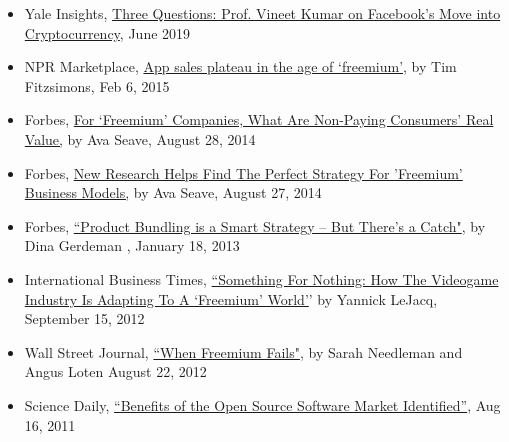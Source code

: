 \documentclass[margin, line, centered, 10pt]{res}
\begin{document}
\begin{resume}
\begin{itemize}
\item Yale Insights, \href{https://insights.som.yale.edu/insights/three-questions-prof-vineet-kumar-on-facebook-s-move-into-cryptocurrency}{Three Questions: Prof. Vineet Kumar on Facebook's Move into Cryptocurrency}, June 2019
\item NPR Marketplace, \href{http://www.marketplace.org/topics/economy/app-sales-plateau-age-freemium}{App sales plateau in the age of `freemium',} by Tim Fitzsimons, Feb 6, 2015
\item Forbes, \href{http://www.forbes.com/sites/avaseave/2014/08/28/for-freemium-companies-what-are-non-paying-consumers-real-value/}{For `Freemium' Companies, What Are Non-Paying Consumers' Real Value,} by Ava Seave, August 28, 2014
\item Forbes, \href{http://www.forbes.com/sites/avaseave/2014/08/27/choosing-the-perfect-strategy-for-freemiums/}{New Research Helps Find The Perfect Strategy For 'Freemium' Business Models,}  by Ava Seave, August 27, 2014
\item Forbes, \href{http://www.forbes.com/sites/hbsworkingknowledge/2013/01/18/product-bundling-is-a-smart-strategy-but-theres-a-catch/}{``Product Bundling is a Smart Strategy -- But There's a Catch"}, by Dina Gerdeman , January 18, 2013
\item International Business Times, \href{http://www.ibtimes.com/something-nothing-how-videogame-industry-adapting-freemium-world-789466}{``Something For Nothing: How The Videogame Industry Is Adapting To A `Freemium' World'}' by Yannick LeJacq, September 15, 2012
\item Wall Street Journal, \href{http://online.wsj.com/news/articles/SB10000872396390443713704577603782317318996}{``When Freemium Fails"}, by Sarah Needleman and Angus Loten
August 22, 2012

\item Science Daily, \href{http://www.sciencedaily.com/releases/2011/08/110816144041.htm}{``Benefits of the Open Source Software Market Identified''}, Aug 16, 2011
\end{itemize}


\end{resume}
\end{document}
